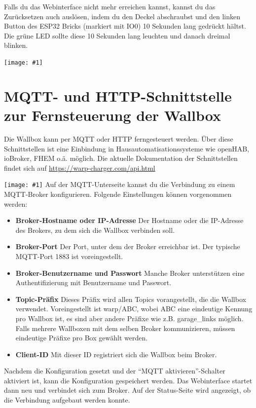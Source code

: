 \documentclass[a4paper,10pt]{article}
\newcommand{\gfx}[1]{\texttt{[image: \#1]}}
\begin{document}
\begin{multicols*}{2}
	Falls du das Webinterface nicht mehr erreichen kannst, kannst du das Zurücksetzen auch
	auslösen, indem du den Deckel abschraubst und den linken Button des ESP32 Bricks (markiert mit IO0)
	10 Sekunden lang gedrückt hältst. Die grüne LED sollte diese 10 Sekunden lang leuchten und danach dreimal blinken.

	\vspace{0.25cm}

	\gfx{./img/resized/warp_esp_open}
	\newpage
	\section{MQTT- und HTTP-Schnittstelle zur Fernsteuerung der Wallbox}
	Die Wallbox kann per MQTT oder HTTP ferngesteuert werden. Über diese Schnittstellen ist eine
	Einbindung in Hausautomatisationssysteme wie openHAB, ioBroker, FHEM o.ä. möglich. Die aktuelle
	Dokumentation der Schnittstellen findet sich auf \url{https://warp-charger.com/api.html}

	\gfx{./img/resized/web_mqtt}
	Auf der MQTT-Unterseite kannst du die Verbindung zu einem MQTT-Broker konfigurieren. Folgende Einstellungen können vorgenommen werden:
	\begin{itemize}
		\item \textbf{Broker-Hostname oder IP-Adresse} Der Hostname oder die IP-Adresse des Brokers, zu dem sich die Wallbox verbinden soll.
		\item \textbf{Broker-Port} Der Port, unter dem der Broker erreichbar ist. Der typische MQTT-Port 1883 ist voreingestellt.
		\item \textbf{Broker-Benutzername und Passwort} Manche Broker unterstützen eine Authentifizierung mit Benutzername und Passwort.
		\item \textbf{Topic-Präfix} Dieses Präfix wird allen Topics vorangestellt, die die Wallbox verwendet.
		      Voreingestellt ist warp/ABC, wobei ABC eine eindeutige Kennung pro Wallbox ist,
		      es sind aber andere Präfixe wie z.B. garage\_links möglich.
		      Falls mehrere Wallboxen mit dem selben Broker kommunizieren,
		      müssen eindeutige Präfixe pro Box gewählt werden.
		\item \textbf{Client-ID} Mit dieser ID registriert sich die Wallbox beim Broker.
	\end{itemize}
	Nachdem die Konfiguration gesetzt und der \enquote{MQTT aktivieren}-Schalter aktiviert ist, kann die Konfiguration gespeichert werden.
	Das Webinterface startet dann neu und verbindet sich zum Broker.
	Auf der Status-Seite wird angezeigt, ob die Verbindung aufgebaut werden konnte.


\end{multicols*}
\end{document}
